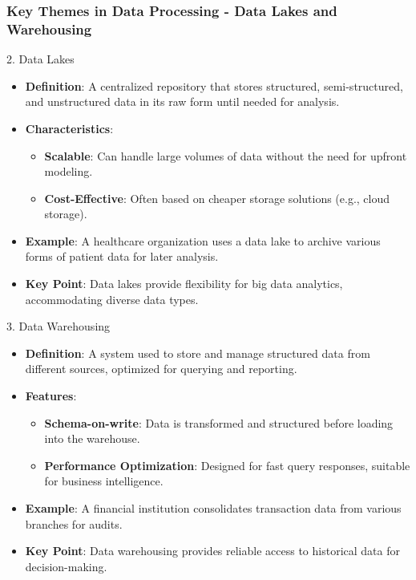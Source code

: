 \documentclass[aspectratio=169]{beamer}
\begin{document}
\begin{frame}[fragile]
    \frametitle{Key Themes in Data Processing - Data Lakes and Warehousing}
    \begin{block}{2. Data Lakes}
        \begin{itemize}
            \item \textbf{Definition}: A centralized repository that stores structured, semi-structured, and unstructured data in its raw form until needed for analysis.
            \item \textbf{Characteristics}:
            \begin{itemize}
                \item \textbf{Scalable}: Can handle large volumes of data without the need for upfront modeling.
                \item \textbf{Cost-Effective}: Often based on cheaper storage solutions (e.g., cloud storage).
            \end{itemize}
            \item \textbf{Example}: A healthcare organization uses a data lake to archive various forms of patient data for later analysis.
            \item \textbf{Key Point}: Data lakes provide flexibility for big data analytics, accommodating diverse data types.
        \end{itemize}
    \end{block}

    \begin{block}{3. Data Warehousing}
        \begin{itemize}
            \item \textbf{Definition}: A system used to store and manage structured data from different sources, optimized for querying and reporting.
            \item \textbf{Features}:
            \begin{itemize}
                \item \textbf{Schema-on-write}: Data is transformed and structured before loading into the warehouse.
                \item \textbf{Performance Optimization}: Designed for fast query responses, suitable for business intelligence.
            \end{itemize}
            \item \textbf{Example}: A financial institution consolidates transaction data from various branches for audits.
            \item \textbf{Key Point}: Data warehousing provides reliable access to historical data for decision-making.
        \end{itemize}
    \end{block}
\end{frame}
\end{document}
